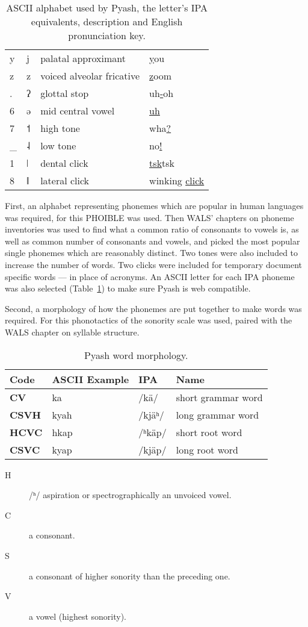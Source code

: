 \begin{table}
\begin{tabular}{llll}
y & {\uni{} j} & palatal approximant & \underline{y}ou\\
z & {\uni{} z} & voiced alveolar fricative & \underline{z}oom\\
\@. & {\uni{} ʔ} & glottal stop & uh\underline{-}oh\\
6 & {\uni{} ə} & mid central vowel&\underline{uh}\\
7 & {\uni{} ˦} & high tone& wha\underline{?}\\
\_ & {\uni{} ˨} & low tone& no\underline{!}\\
1 & {\uni{} ǀ} & dental click & \underline{tsk}tsk\\
8 & {\uni{} ǁ} & lateral click & winking \underline{click} \\
\end{tabular}
  \caption{ASCII alphabet used by Pyash,
  the letter's IPA equivalents, description and English pronunciation key.}\label{table:phonology}
\end{table}
 
First, an alphabet representing phonemes which are popular in human
languages was required, for this PHOIBLE\cite{phoible} was used.  Then WALS'\cite{WALS}
chapters on phoneme inventories was used to find what a common ratio of consonants to
vowels is, as well as common number of consonants and vowels, and picked the most
popular single phonemes which are reasonably distinct. Two tones were also
included to increase the number of words. Two clicks were included for 
temporary document specific words --- in place of acronyms. 
An ASCII letter for each IPA phoneme was also selected
(Table~\ref{table:phonology}) to
make sure Pyash is web compatible. 

Second, a morphology of how the phonemes are put together to make
words was required. For this phonotactics of the sonority scale\cite{sonority} was used,
paired with the WALS\cite{WALS} chapter on syllable structure. 

\begin{table}
  \begin{tabular}{llll}
    Code & ASCII Example & IPA & Name \\
    \midrule{}
    \textbf{CV}  &  ka & /{\uni{}kä}/ &  short grammar word \\
    \textbf{CSVH} & kyah & /{\uni{}kjäʰ}/ & long grammar word \\
    \textbf{HCVC} & hkap & /{\uni{}ʰkäp}/ & short root word \\
    \textbf{CSVC} & kyap & /{\uni{}kjäp}/ & long root word \\
  \end{tabular}
  \begin{description}
    \item[H] /{\uni{}ʰ}/ aspiration or spectrographically an unvoiced vowel. 
    \item[C] a consonant.
    \item[S] a consonant of higher sonority than the preceding one.
    \item[V] a vowel (highest sonority).
  \end{description}
  \caption{Pyash word morphology.
  }\label{table:morphology}
\end{table}

